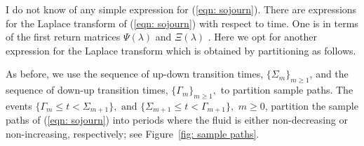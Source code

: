 I do not know of any simple expression for (\ref{eqn: sojourn}). There are expressions for the Laplace transform of (\ref{eqn: sojourn}) with respect to time. One is in terms of the first return matrices \(\Psi(\lambda)\) and \(\Xi(\lambda)\) \citep{bean2009}. Here we opt for another expression for the Laplace transform which is obtained by partitioning as follows.

As before, we use the sequence of up-down transition times, \(\{\Sigma_m\}_{m\geq 1}\), and the sequence of down-up transition times, \(\{\Gamma_m\}_{m\geq 1},\) to partition sample paths. The events \(\{\Gamma_m\leq t< \Sigma_{m+1}\} , \mbox{ and } \{\Sigma_{m+1}\leq t< \Gamma_{m+1}\}, \) \(m\geq 0\), partition the sample paths of (\ref{eqn: sojourn}) into periods where the fluid is either non-decreasing or non-increasing, respectively; see Figure~\ref{fig: sample paths}.
